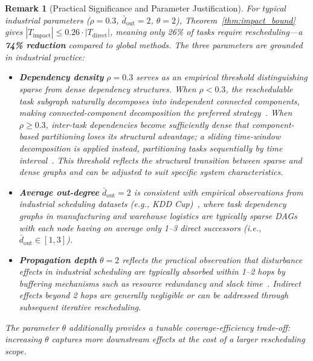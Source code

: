 \documentclass[manuscript,screen,review]{acmart}
\newtheorem{remark}{Remark}
\begin{document}
\begin{remark}[Practical Significance and Parameter Justification]
For typical industrial parameters ($\rho = 0.3$, $\bar{d}_{\mathrm{out}} = 2$, $\theta = 2$),
Theorem~\ref{thm:impact_bound} gives $|T_{\mathrm{impact}}| \leq 0.26 \cdot |T_{\mathrm{direct}}|$,
meaning only 26\% of tasks require rescheduling---a \textbf{74\% reduction} compared to global methods.
The three parameters are grounded in industrial practice:

\begin{itemize}
    \item \textbf{Dependency density} $\rho = 0.3$ serves as an empirical threshold
    distinguishing sparse from dense dependency structures.
    When $\rho < 0.3$, the reschedulable task subgraph naturally decomposes into
    independent connected components, making connected-component decomposition the
    preferred strategy~\cite{wu2020disruption}.
    When $\rho \geq 0.3$, inter-task dependencies become sufficiently dense that
    component-based partitioning loses its structural advantage; a sliding time-window
    decomposition is applied instead, partitioning tasks sequentially by time
    interval~\cite{wu2020disruption}.
    This threshold reflects the structural transition between sparse and dense graphs
    and can be adjusted to suit specific system characteristics.

    \item \textbf{Average out-degree} $\bar{d}_{\mathrm{out}} = 2$ is consistent with
    empirical observations from industrial scheduling datasets (e.g., KDD
    Cup)~\cite{kasapidis2021flexible}, where task dependency graphs
    in manufacturing and warehouse logistics are typically sparse DAGs with each node
    having on average only 1--3 direct successors
    (i.e., $\bar{d}_{\mathrm{out}} \in [1, 3]$).

    \item \textbf{Propagation depth} $\theta = 2$ reflects the practical observation
    that disturbance effects in industrial scheduling are typically absorbed within
    1--2 hops by buffering mechanisms such as resource redundancy and slack
    time~\cite{sundstrom2017conflict}.
    Indirect effects beyond 2 hops are generally negligible or can be addressed
    through subsequent iterative rescheduling.
\end{itemize}

The parameter $\theta$ additionally provides a tunable coverage-efficiency trade-off:
increasing $\theta$ captures more downstream effects at the cost of a larger
rescheduling scope.
\end{remark}
\end{document}
